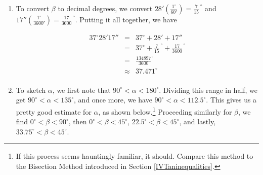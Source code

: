 \documentclass{ximera}
\begin{document}
\begin{example}
\begin{enumerate}
\item  To convert $\beta$ to decimal degrees, we convert $28' \left(\frac{1^{\circ}}{60'}\right) = \frac{7}{15}^{\, \circ}$ and $17''\left(\frac{1^{\circ}}{3600'}\right) = \frac{17}{3600}^{\, \circ}$.  Putting it all together, we have

\[ \begin{array}{rcl}

 37^{\circ}28'17'' & = & 37^{\circ} + 28' + 17'' \\  
                   & = & 37^{\circ} +  \frac{7}{15}^{\, \circ} + \frac{17}{3600}^{\, \circ} \\  
                   & = & \frac{134897}{3600}^{\circ} \\  
                   & \approx & 37.471^{\circ} \\ \end{array} \]

\item  To sketch $\alpha$, we first note that $90^{\circ} < \alpha < 180^{\circ}$.  Dividing this range in half, we get $90^{\circ} < \alpha < 135^{\circ}$, and once more, we have $90^{\circ} < \alpha < 112.5^{\circ}$.  This gives us a pretty good estimate for $\alpha$, as shown below.\footnote{If this process seems hauntingly familiar, it should. Compare this method to the Bisection Method introduced in Section \ref{IVTaninequalities}.}  Proceeding similarly for $\beta$, we find $0^{\circ} < \beta < 90^{\circ}$, then $0^{\circ} < \beta < 45^{\circ}$, $22.5^{\circ} < \beta < 45^{\circ}$, and lastly, $33.75^{\circ} < \beta < 45^{\circ}$.  

\begin{image}
\end{image}
\end{enumerate}
\end{example}
\end{document}
